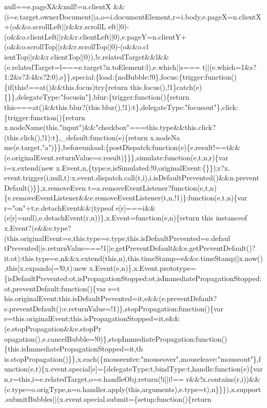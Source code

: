 \begin{DoxyCode}
{       null==e.pageX&&null!=n.clientX
      &&(i=e.target.ownerDocument||a,o=i.documentElement,r=i.body,e.pageX=n.clientX+(o&&o.scrollLeft||r&&r.scrollL
      eft||0)-(o&&o.clientLeft||r&&r.clientLeft||0),e.pageY=n.clientY+(o&&o.scrollTop||r&&r.scrollTop||0)-(o&&o.cl
      ientTop||r&&r.clientTop||0)),!e.relatedTarget&&l&&(e.relatedTarget=l===e.target?n.toElement:l),e.which||s===
      t||(e.which=1&s?1:2&s?3:4&s?2:0),e\}\},special:\{load:\{noBubble:!0\},focus:\{trigger:function()\{if(this!==at()&&this.focus)try\{return this.focus(),!1\}catch(e)\{\}\},delegateType:"focusin"\},blur:\{trigger:function()\{return
       this===at()&&this.blur?(this.blur(),!1):t\},delegateType:"focusout"\},click:\{trigger:function()\{return
       x.nodeName(this,"input")&&"checkbox"===this.type&&this.click?(this.click(),!1):t\},\_default:function(e)\{return
       x.nodeNa
      me(e.target,"a")\}\},beforeunload:\{postDispatch:function(e)\{e.result!==t&&(e.originalEvent.returnValue=e.result)\}\}\},simulate:function(e,t,n,r)\{var i=x.extend(new
       x.Event,n,\{type:e,isSimulated:!0,originalEvent:\{\}\});r?x.
      event.trigger(i,null,t):x.event.dispatch.call(t,i),i.isDefaultPrevented()&&n.preventDefault()\}\},x.removeEven
      t=a.removeEventListener?function(e,t,n)\{e.removeEventListener&&e.removeEventListener(t,n,!1)\}:function(e,t,n)\{var r="on"+t;e.detachEvent&&(typeof
       e[r]===i&&(e[r]=null),e.detachEvent(r,n))\},x.Event=function(e,n)\{return this instanceof
       x.Event?(e&&e.type?(this.originalEvent=e,this.type=e.type,this.isDefaultPrevented=e.defaul
      tPrevented||e.returnValue===!1||e.getPreventDefault&&e.getPreventDefault()?it:ot):this.type=e,n&&x.extend(this,n),this.timeStamp=e&&e.timeStamp||x.now(),this[x.expando]=!0,t):new
       x.Event(e,n)\},x.Event.prototype=\{isDefaultPrevented:ot,isPropagationStopped:ot,isImmediatePropagationStopped:ot,preventDefault:function()\{var
       e=t
      his.originalEvent;this.isDefaultPrevented=it,e&&(e.preventDefault?e.preventDefault():e.returnValue=!1)\},stopPropagation:function()\{var
       e=this.originalEvent;this.isPropagationStopped=it,e&&(e.stopPropagation&&e.stopPr
      opagation(),e.cancelBubble=!0)\},stopImmediatePropagation:function()\{this.isImmediatePropagationStopped=it,th
      is.stopPropagation()\}\},x.each(\{mouseenter:"mouseover",mouseleave:"mouseout"\},function(e,t)\{x.event.special[e]=\{delegateType:t,bindType:t,handle:function(e)\{var
       n,r=this,i=e.relatedTarget,o=e.handleObj;return(!i||i!==
      r&&!x.contains(r,i))&&(e.type=o.origType,n=o.handler.apply(this,arguments),e.type=t),n\}\}\}),x.support.submitBubbles||(x.event.special.submit=\{setup:function()\{return
}
\end{DoxyCode}
